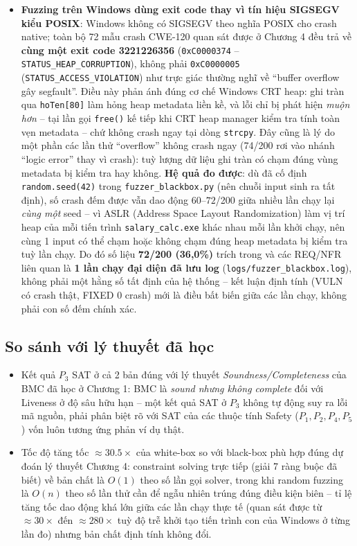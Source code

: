 \begin{itemize}
  \item \textbf{Fuzzing trên Windows dùng exit code thay vì tín hiệu SIGSEGV kiểu POSIX}: Windows không có SIGSEGV theo nghĩa POSIX cho crash native; toàn bộ 72 mẫu crash CWE-120 quan sát được ở Chương 4 đều trả về \textbf{cùng một exit code 3221226356} (\texttt{0xC0000374} -- \texttt{STATUS\_HEAP\_CORRUPTION}), không phải \texttt{0xC0000005} (\texttt{STATUS\_ACCESS\_VIOLATION}) như trực giác thường nghĩ về ``buffer overflow gây segfault''. Điều này phản ánh đúng cơ chế Windows CRT heap: ghi tràn qua \texttt{hoTen[80]} làm hỏng heap metadata liền kề, và lỗi chỉ bị phát hiện \emph{muộn hơn} -- tại lần gọi \texttt{free()} kế tiếp khi CRT heap manager kiểm tra tính toàn vẹn metadata -- chứ không crash ngay tại dòng \texttt{strcpy}. Đây cũng là lý do một phần các lần thử ``overflow'' không crash ngay (74/200 rơi vào nhánh ``logic error'' thay vì crash): tuỳ lượng dữ liệu ghi tràn có chạm đúng vùng metadata bị kiểm tra hay không. \textbf{Hệ quả đo được}: dù đã cố định \texttt{random.seed(42)} trong \texttt{fuzzer\_blackbox.py} (nên chuỗi input sinh ra tất định), số crash đếm được vẫn dao động $60$--$72$/200 giữa nhiều lần chạy lại \emph{cùng một} seed -- vì ASLR (Address Space Layout Randomization) làm vị trí heap của mỗi tiến trình \texttt{salary\_calc.exe} khác nhau mỗi lần khởi chạy, nên cùng 1 input có thể chạm hoặc không chạm đúng heap metadata bị kiểm tra tuỳ lần chạy. Do đó số liệu \textbf{72/200 (36{,}0\%)} trích trong  và các REQ/NFR liên quan là \textbf{1 lần chạy đại diện đã lưu log} (\texttt{logs/fuzzer\_blackbox.log}), không phải một hằng số tất định của hệ thống -- kết luận định tính (VULN có crash thật, FIXED 0 crash) mới là điều bất biến giữa các lần chạy, không phải con số đếm chính xác.
\end{itemize}

\subsection{So sánh với lý thuyết đã học}

\begin{itemize}
  \item Kết quả $P_3$ SAT ở cả 2 bản đúng với lý thuyết \emph{Soundness/Completeness} của BMC đã học ở Chương 1: BMC là \emph{sound nhưng không complete} đối với Liveness ở độ sâu hữu hạn -- một kết quả SAT ở $P_3$ không tự động suy ra lỗi mã nguồn, phải phân biệt rõ với SAT của các thuộc tính Safety ($P_1,P_2,P_4,P_5$) vốn luôn tương ứng phản ví dụ thật.
  \item Tốc độ tăng tốc $\approx 30.5\times$ của white-box so với black-box phù hợp đúng dự đoán lý thuyết Chương 4: constraint solving trực tiếp (giải 7 ràng buộc đã biết) về bản chất là $O(1)$ theo số lần gọi solver, trong khi random fuzzing là $O(n)$ theo số lần thử cần để ngẫu nhiên trúng đúng điều kiện biên -- tỉ lệ tăng tốc dao động khá lớn giữa các lần chạy thực tế (quan sát được từ $\approx 30\times$ đến $\approx 280\times$ tuỳ độ trễ khởi tạo tiến trình con của Windows ở từng lần đo) nhưng bản chất định tính không đổi.
\end{itemize}

